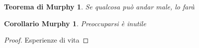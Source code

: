 \theoremstyle{plain}
\newtheorem{teoremaMurphy}{Teorema di Murphy}
\newtheorem{corollarioMurphy}{Corollario Murphy}

\begin{teoremaMurphy} Se qualcosa può andar male,
lo farà \end{teoremaMurphy}

\begin{corollarioMurphy} Preoccuparsi è 
inutile \end{corollarioMurphy}

\begin{proof} Esperienze di vita \end{proof} 
